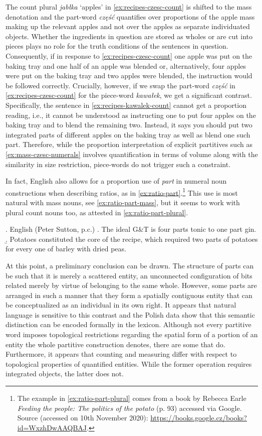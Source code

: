 The count plural \textit{jabłka} `apples' in \ref{ex:recipes-czesc-count} is shifted to the mass denotation and the part-word \textit{część} quantifies over proportions of the apple mass making up the relevant apples and not over the apples as separate individuated objects. Whether the ingredients in question are stored as wholes or are cut into pieces plays no role for the truth conditions of the sentences in question. Consequently, if in response to \ref{ex:recipes-czesc-count} one apple was put on the baking tray and one half of an apple was blended or, alternatively, four apples were put on the baking tray and two apples were blended, the instruction would be followed correctly. Crucially, however, if we swap the part-word \textit{część} in \ref{ex:recipes-czesc-count} for the piece-word \textit{kawałek}, we get a significant contrast. Specifically, the sentence in \ref{ex:recipes-kawalek-count} cannot get a proportion reading, i.e., it cannot be understood as instructing one to put four apples on the baking tray and to blend the remaining two. Instead, it says you should put two integrated parts of different apples on the baking tray as well as blend one such part. Therefore, while the proportion interpretation of explicit partitives such as \ref{ex:mass-czesc-numerals} involves quantification in terms of volume along with the similarity in size restriction, piece-words do not trigger such a constraint.

In fact, English also allows for a proportion use of \textit{part} in numeral noun constructions when describing ratios, as in \ref{ex:ratio-part}.\footnote{The example in \ref{ex:ratio-part-plural} comes from a book by Rebecca Earle \textit{Feeding the people: The politics of the potato} (p. 93) accessed via Google. Source (accessed on 10th November 2020): \url{https://books.google.cz/books?id=WxzhDwAAQBAJ}.} This use is most natural with mass nouns, see \ref{ex:ratio-part-mass}, but it seems to work with plural count nouns too, as attested in \ref{ex:ratio-part-plural}.

\ex. English (Peter Sutton, p.c.)\label{ex:ratio-part}
\a. The ideal G\&T is four parts tonic to one part gin.\label{ex:ratio-part-mass}
\b. Potatoes constituted the core of the recipe, which required two parts of potatoes for every one of barley with dried peas.\label{ex:ratio-part-plural}

At this point, a preliminary conclusion can be drawn. The structure of parts can be such that it is merely a scattered entity, an unconnected configuration of bits related merely by virtue of belonging to the same whole. However, some parts are arranged in such a manner that they form a spatially contiguous entity that can be conceptualized as an individual in its own right. It appears that natural language is sensitive to this contrast and the Polish data show that this semantic distinction can be encoded formally in the lexicon. Although not every partitive word imposes topological restrictions regarding the spatial form of a portion of an entity the whole partitive construction denotes, there are some that do. Furthermore, it appears that counting and measuring differ with respect to topological properties of quantified entities. While the former operation requires integrated objects, the latter does not. 

